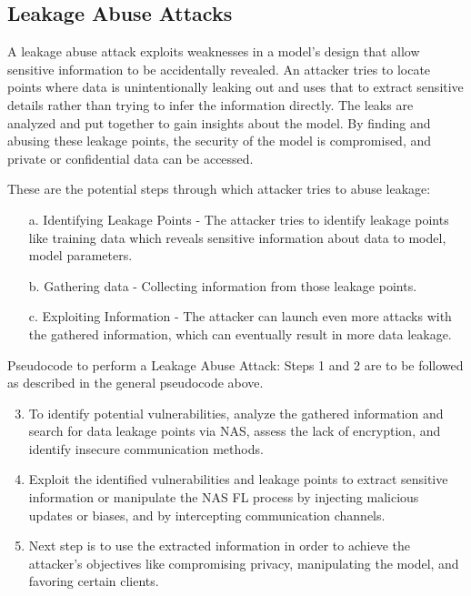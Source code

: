 \documentclass[conference]{IEEEtran}
\begin{document}
\subsection{Leakage Abuse Attacks }
A leakage abuse attack exploits weaknesses in a model's design that allow sensitive information to be accidentally revealed. An attacker tries to locate points where data is unintentionally leaking out and uses that to extract sensitive details rather than trying to infer the information directly. The leaks are analyzed and put together to gain insights about the model.  By finding and abusing these leakage points, the security of the model is compromised, and private or confidential data can be accessed. 

These are the potential steps through which attacker tries to abuse leakage:

\begin{itemize}
    \item[a.] Identifying Leakage Points - The attacker tries to identify leakage points like training data which reveals sensitive information about data to model, model parameters.
    \item[b.] Gathering data - Collecting information from those leakage points.
    \item[c.] Exploiting Information - The attacker can launch even more attacks with the gathered information, which can eventually result in more data leakage.
\end{itemize}

Pseudocode to perform a Leakage Abuse Attack:
Steps 1 and 2 are to be followed as described in the general pseudocode above.
\begin{enumerate}
  \setcounter{enumi}{2}
\item To identify potential vulnerabilities, analyze the gathered information and search for data leakage points via NAS, assess the lack of encryption, and identify insecure communication methods.

\item Exploit the identified vulnerabilities and leakage points to extract sensitive information or manipulate the NAS FL process by injecting malicious updates or biases, and by intercepting communication channels.

\item Next step is to use the extracted information in order to achieve the attacker's objectives like compromising privacy, manipulating the model, and favoring certain clients.

\end{enumerate} 
\end{document}
